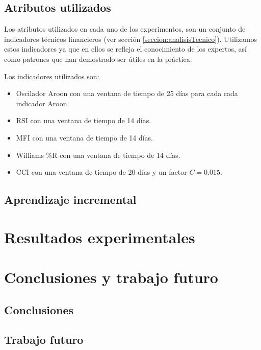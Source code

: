 \documentclass[onesided, 12pt]{scrbook}
\theoremstyle{break}
\begin{document}
\section{Atributos utilizados}
\label{seccion:atributos}
Los atributos utilizados en cada uno de los experimentos, son un conjunto de indicadores técnicos financieros (ver sección \ref{seccion:analisisTecnico}). Utilizamos estos indicadores ya que en ellos se refleja el conocimiento de los expertos, así como patrones que han demostrado ser útiles en la práctica.

Los indicadores utilizados son:
\begin{itemize}
\item Oscilador Aroon con una ventana de tiempo de 25 días para cada cada indicador Aroon.

\item RSI con una ventana de tiempo de 14 días.

\item MFI con una ventana de tiempo de 14 días.

\item Williams \%R con una ventana de tiempo de 14 días.

\item CCI con una ventana de tiempo de 20 días y un factor $C=0.015$.
\end{itemize}


\section{Aprendizaje incremental}
\label{seccion:aprendizaje incremental}

\chapter{Resultados experimentales}
\label{capitulo:resultados experimentales}

\chapter{Conclusiones y trabajo futuro}
\label{capitulo:conclusiones}

\section{Conclusiones}
\label{seccion:conclusiones}

\section{Trabajo futuro}
\label{seccion:trabajo futuro}




%
\end{document}
